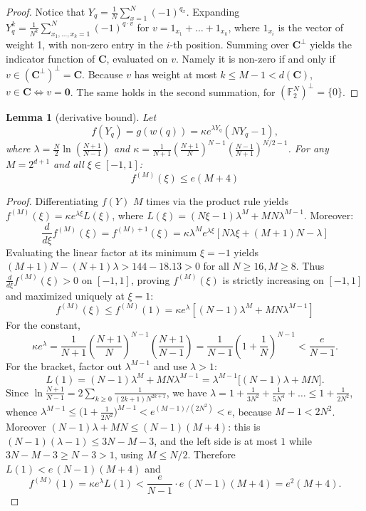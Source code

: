 \documentclass[11pt,a4paper]{article}
\newtheorem{lemma}[theorem]{Lemma}
\theoremstyle{definition}
\begin{document}
\begin{proof} Notice that $Y_q = \frac{1}{N}\sum_{x=1}^{N}(-1)^{q_x}$.
Expanding $Y_q^k = \frac{1}{N^k} \sum_{x_1, \dots, x_k = 1}^N (-1)^{q \cdot v}$ for $v = 1_{x_1} + \dots + 1_{x_k}$, where $1_{x_i}$ is the vector of weight 1, with non-zero entry in the $i$-th position. Summing over $\mathbf{C}^\perp$ yields the indicator function of $\mathbf{C}$, evaluated on $v$. Namely it is non-zero if and only if $v \in (\mathbf{C}^\perp)^\perp = \mathbf{C}$. Because $v$ has weight at most $k \le M - 1 < d(\mathbf{C})$, $v \in \mathbf{C} \iff v = \mathbf{0}$. The same holds in the second summation, for $(\mathbb{F}_2^N)^\perp = \{0\}$.
\end{proof}

\begin{lemma}[derivative bound]
\label{lem:global_derivative}
Let \[f(Y_q) = g(w(q)) = \kappa e^{\lambda Y_q} (NY_q - 1),\] where $\lambda = \frac{N}{2} \ln\left(\frac{N+1}{N-1}\right)$ and $\kappa = \frac{1}{N+1} \left(\frac{N+1}{N}\right)^{N-1} \left(\frac{N-1}{N+1}\right)^{N/2-1}$. For any $M = 2^{d+1}$ and all $\xi \in [-1, 1]$:
\[
f^{(M)}(\xi) \le e (M+4)
\]
\end{lemma}

\begin{proof}
Differentiating $f(Y)$ $M$ times via the product rule yields $f^{(M)}(\xi) = \kappa e^{\lambda \xi} L(\xi)$, where $L(\xi) = (N\xi - 1)\lambda^M + M N \lambda^{M-1}$. Moreover:
\[
\frac{d}{d\xi} f^{(M)}(\xi) = f^{(M)+1}(\xi) =\kappa \lambda^M e^{\lambda \xi} \left[ N\lambda \xi + (M+1)N - \lambda \right]
\]
Evaluating the linear factor at its minimum $\xi = -1$ yields $(M+1)N - (N+1)\lambda > 144 - 18.13 > 0$ for all $N \ge 16, M \ge 8$. Thus $\frac{d}{d\xi} f^{(M)}(\xi) > 0$ on $[-1, 1]$, proving $f^{(M)}(\xi)$ is strictly increasing on $[-1, 1]$ and maximized uniquely at $\xi = 1$:
\[
f^{(M)}(\xi) \le f^{(M)}(1) = \kappa e^\lambda \left[ (N - 1)\lambda^M + M N \lambda^{M-1} \right]
\]
For the constant,
\[
\kappa e^\lambda = \frac{1}{N+1}\left(\frac{N+1}{N}\right)^{N-1}\left(\frac{N+1}{N-1}\right) = \frac{1}{N-1}\left(1 + \frac{1}{N}\right)^{N-1} < \frac{e}{N-1}.
\]
For the bracket, factor out $\lambda^{M-1}$ and use $\lambda>1$:
\[
L(1) = (N-1)\lambda^{M} + MN\lambda^{M-1}
 = \lambda^{M-1}\bigl[(N-1)\lambda + MN\bigr] .
\]
Since $\ln\frac{N+1}{N-1}=2\sum_{k\ge0}\frac{1}{(2k+1)N^{2k+1}}$, we have
$\lambda = 1+\frac{1}{3N^{2}}+\frac{1}{5N^{4}}+\dots \le 1+\frac{1}{2N^{2}}$, whence
$\lambda^{M-1}\le\bigl(1+\frac{1}{2N^{2}}\bigr)^{M-1}<e^{(M-1)/(2N^{2})}<e$,
because $M-1<2N^{2}$. Moreover $(N-1)\lambda+MN\le(N-1)(M+4)$: this is
$(N-1)(\lambda-1)\le 3N-M-3$, and the left side is at most $1$ while
$3N-M-3\ge N-3>1$, using $M\le N/2$. Therefore
$L(1) < e\,(N-1)(M+4)$ and
\[
f^{(M)}(1) = \kappa e^{\lambda}L(1) < \frac{e}{N-1}\cdot e\,(N-1)(M+4) = e^{2}(M+4).
\]
\end{proof}
\end{document}
